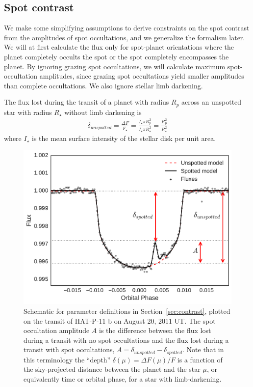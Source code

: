 \begin{subappendices}
\section*{Spot contrast} \label{sec:appendix_contrast}

We make some simplifying assumptions to derive constraints on the spot contrast from the amplitudes of spot occultations, and we generalize the formalism later. We will at first calculate the flux only for spot-planet orientations where the planet completely occults the spot or the spot completely encompasses the planet. By ignoring grazing spot occultations, we will calculate maximum spot-occultation amplitudes, since grazing spot occultations yield smaller amplitudes than complete occultations. We also ignore stellar limb darkening.

The flux lost during the transit of a planet with radius $R_p$ across an unspotted star with radius $R_\star$ without limb darkening is
\begin{eqnarray}
\delta_{unspotted} = \frac{\Delta F}{F_\star} = \frac{I_\star \pi R_p^2}{I_\star \pi R_\star^2} = \frac{R_p^2}{R_\star^2}
\end{eqnarray}
where $I_\star$ is the mean surface intensity of the stellar disk per unit area. 
\begin{figure}
\centering
\includegraphics[scale=0.8]{stsp_hat_p_11/contrast_schematic.pdf}
\caption{Schematic for parameter definitions in Section~\ref{sec:contrast}, plotted on the transit of HAT-P-11 b on August 20, 2011 UT. The spot occultation amplitude $A$ is the difference between the flux lost during a transit with no spot occultations and the flux lost during a transit with spot occultations, $A = \delta_{unspotted} - \delta_{spotted}$. Note that in this terminology the ``depth'' $\delta(\mu) = \Delta F(\mu)/F$ is a function of the sky-projected distance between the planet and the star $\mu$, or equivalently time or orbital phase, for a star with limb-darkening.}
\label{fig:contrast_schematic}
\end{figure}


\end{subappendices}
